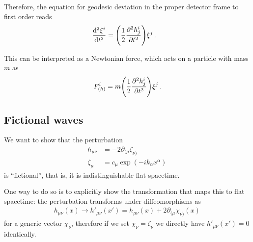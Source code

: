 \documentclass[main.tex]{subfiles}
\begin{document}
Therefore, the equation for geodesic deviation in the proper detector frame to first order reads 
%
\begin{align}
\dv[2]{\xi^{i}}{t} &= \qty( \frac{1}{2} \pdv[2]{h^{i}_{j}}{t} ) \xi^{j}
\,.
\end{align}

This can be interpreted as a Newtonian force, which acts on a particle with mass \(m\) as
%
\begin{align}
F_{(h)}^{i} = m \qty( \frac{1}{2} \pdv[2]{h^{i}_{j}}{t} ) \xi^{j}
\,.
\end{align}

\subsection{Fictional waves}

We want to show that the perturbation 
%
\begin{align}
h_{\mu \nu } &= - 2 \partial_{(\mu } \zeta_{\nu )}  \\
\zeta_{\mu } &= c_\mu \exp( - i k_\alpha x^{\alpha })
\,
\end{align}
%
is ``fictional'', that is, it is indistinguishable flat spacetime.

One way to do so is to explicitly show the transformation that maps this to flat spacetime: the perturbation transforms under diffeomorphisms as 
%
\begin{align}
h_{\mu \nu } (x) \to h'_{\mu \nu } (x') = h_{\mu \nu } (x) + 2 \partial_{(\mu } \chi_{\nu )} (x)
\,
\end{align}
%
for a generic vector \(\chi_{\nu }\), therefore if we set \(\chi _\nu = \zeta _\nu \) we directly have \(h'_{\mu \nu } (x') = 0\) identically.
\end{document}
